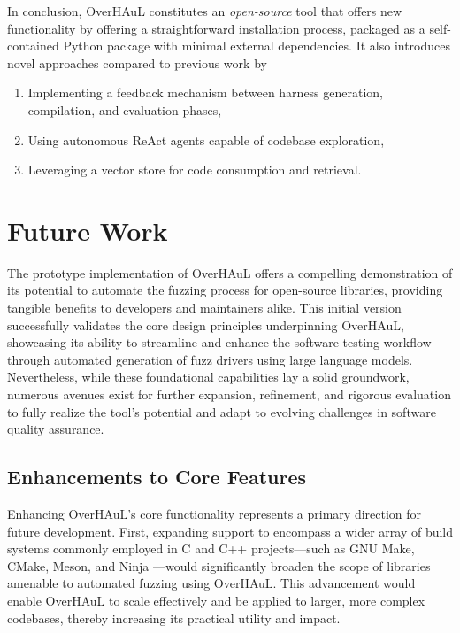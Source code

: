 \documentclass[
  a4paper,
]{scrreprt}
\providecommand{\tightlist}{%
  \setlength{\itemsep}{0pt}\setlength{\parskip}{0pt}}
\theoremstyle{definition}
\theoremstyle{remark}
\begin{document}
In conclusion, OverHAuL constitutes an \emph{open-source} tool that
offers new functionality by offering a straightforward installation
process, packaged as a self-contained Python package with minimal
external dependencies. It also introduces novel approaches compared to
previous work by

\begin{enumerate}
\def\labelenumi{\arabic{enumi}.}
\tightlist
\item
  Implementing a feedback mechanism between harness generation,
  compilation, and evaluation phases,
\item
  Using autonomous ReAct agents capable of codebase exploration,
\item
  Leveraging a vector store for code consumption and retrieval.
\end{enumerate}


\chapter{Future Work}\label{future-work}

The prototype implementation of OverHAuL offers a compelling
demonstration of its potential to automate the fuzzing process for
open-source libraries, providing tangible benefits to developers and
maintainers alike. This initial version successfully validates the core
design principles underpinning OverHAuL, showcasing its ability to
streamline and enhance the software testing workflow through automated
generation of fuzz drivers using large language models. Nevertheless,
while these foundational capabilities lay a solid groundwork, numerous
avenues exist for further expansion, refinement, and rigorous evaluation
to fully realize the tool's potential and adapt to evolving challenges
in software quality assurance.

\section{Enhancements to Core
Features}\label{enhancements-to-core-features}

Enhancing OverHAuL's core functionality represents a primary direction
for future development. First, expanding support to encompass a wider
array of build systems commonly employed in C and C++ projects---such as
GNU Make, CMake, Meson, and Ninja
\autocite{cedilnik2000,feldman1979,martin2025,pakkanen2025}---would
significantly broaden the scope of libraries amenable to automated
fuzzing using OverHAuL. This advancement would enable OverHAuL to scale
effectively and be applied to larger, more complex codebases, thereby
increasing its practical utility and impact.
\end{document}
